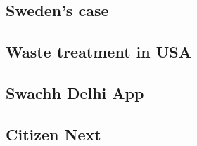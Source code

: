\documentclass[10pt]{article}
\begin{document}
\subsection{Sweden's case}

\subsection{Waste treatment in USA}

\subsection{Swachh Delhi App}

\subsection{Citizen Next}



\end{document}
